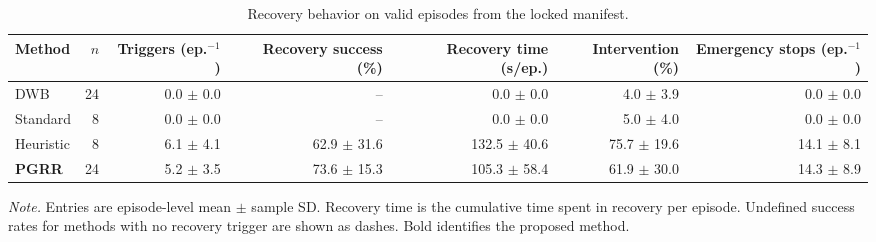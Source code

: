 \begin{table}[t]
\caption{Recovery behavior on valid episodes from the locked manifest.}
\label{tab:recovery-metrics}
\centering
\footnotesize
\setlength{\tabcolsep}{4.5pt}
\renewcommand{\arraystretch}{1.08}
\begin{tabular}{@{}lrrrrrr@{}}
\toprule
Method & $n$ & Triggers (ep.$^{-1}$) & Recovery success (\%)
& Recovery time (s/ep.) & Intervention (\%) & Emergency stops (ep.$^{-1}$) \\
\midrule
DWB & 24 & 0.0 $\pm$ 0.0 & -- & 0.0 $\pm$ 0.0 & 4.0 $\pm$ 3.9 & 0.0 $\pm$ 0.0 \\
Standard & 8 & 0.0 $\pm$ 0.0 & -- & 0.0 $\pm$ 0.0 & 5.0 $\pm$ 4.0 & 0.0 $\pm$ 0.0 \\
Heuristic & 8 & 6.1 $\pm$ 4.1 & 62.9 $\pm$ 31.6 & 132.5 $\pm$ 40.6 & 75.7 $\pm$ 19.6 & 14.1 $\pm$ 8.1 \\
\addlinespace[2pt]
\textbf{PGRR} & 24 & 5.2 $\pm$ 3.5 & 73.6 $\pm$ 15.3 & 105.3 $\pm$ 58.4 & 61.9 $\pm$ 30.0 & 14.3 $\pm$ 8.9 \\
\bottomrule
\end{tabular}
\vspace{2pt}

\parbox{0.98\textwidth}{\footnotesize \emph{Note.} Entries are episode-level mean
$\pm$ sample SD. Recovery time is the cumulative time spent in recovery per episode. Undefined
success rates for methods with no recovery trigger are shown as dashes. Bold identifies the
proposed method.}
\end{table}
